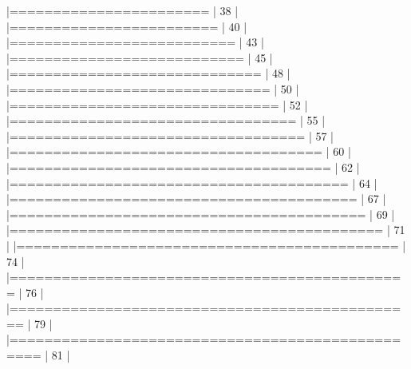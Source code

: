 \documentclass[nojss,shortnames]{jss}
\begin{document}
\begin{Schunk}
\begin{Soutput}
  |=======================                                     |  38%
  |                                                                  
  |========================                                    |  40%
  |                                                                  
  |==========================                                  |  43%
  |                                                                  
  |===========================                                 |  45%
  |                                                                  
  |=============================                               |  48%
  |                                                                  
  |==============================                              |  50%
  |                                                                  
  |===============================                             |  52%
  |                                                                  
  |=================================                           |  55%
  |                                                                  
  |==================================                          |  57%
  |                                                                  
  |====================================                        |  60%
  |                                                                  
  |=====================================                       |  62%
  |                                                                  
  |=======================================                     |  64%
  |                                                                  
  |========================================                    |  67%
  |                                                                  
  |=========================================                   |  69%
  |                                                                  
  |===========================================                 |  71%
  |                                                                  
  |============================================                |  74%
  |                                                                  
  |==============================================              |  76%
  |                                                                  
  |===============================================             |  79%
  |                                                                  
  |=================================================           |  81%
  |                                                                  

\end{Soutput}
\end{Schunk}
\end{document}
